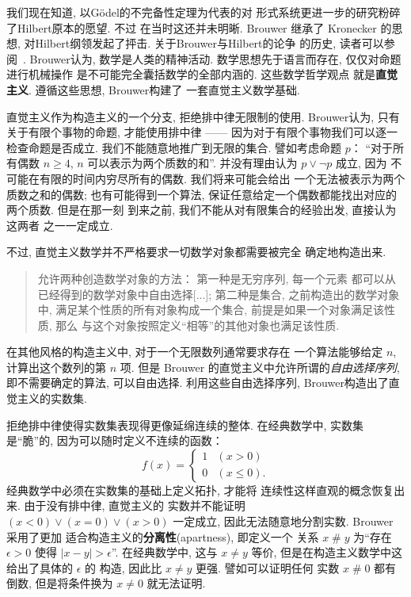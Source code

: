 \documentclass[UTF8]{ctexbook}
\theoremstyle{plain}
\theoremstyle{definition}
\theoremstyle{remark}
\begin{document}
我们现在知道, 以G\"odel的不完备性定理为代表的对
形式系统更进一步的研究粉碎了Hilbert原本的愿望. 不过
在当时这还并未明晰. Brouwer 继承了 Kronecker 的思想,
对Hilbert纲领发起了抨击. 关于Brouwer与Hilbert的论争
的历史, 读者可以参阅~\cite{carl:1998:brouwer}.
Brouwer认为, 数学是人类的精神活动.
数学思想先于语言而存在, 仅仅对命题进行机械操作
是不可能完全囊括数学的全部内涵的. 这些数学哲学观点
就是\textbf{直觉主义}. 遵循这些思想, Brouwer构建了
一套直觉主义数学基础.

直觉主义作为构造主义的一个分支, 拒绝排中律无限制的使用.
Brouwer认为, 只有关于有限个事物的命题, 才能使用排中律
------ 因为对于有限个事物我们可以逐一检查命题是否成立.
我们不能随意地推广到无限的集合. 譬如考虑命题 \(p\)：
“对于所有偶数 \(n \ge 4\), \(n\) 可以表示为两个质数的和”.
并没有理由认为 \(p \vee \neg p\) 成立, 因为
不可能在有限的时间内穷尽所有的偶数. 我们将来可能会给出
一个无法被表示为两个质数之和的偶数; 也有可能得到一个算法,
保证任意给定一个偶数都能找出对应的两个质数. 但是在那一刻
到来之前, 我们不能从对有限集合的经验出发, 直接认为这两者
之一一定成立.

不过, 直觉主义数学并不严格要求一切数学对象都需要被完全
确定地构造出来.
\begin{quotation}
允许两种创造数学对象的方法： 第一种是无穷序列, 每一个元素
都可以从已经得到的数学对象中自由选择[...]; 第二种是集合,
之前构造出的数学对象中, 满足某个性质的所有对象构成一个集合,
前提是如果一个对象满足该性质, 那么
与这个对象按照定义“相等”的其他对象也满足该性质.~\cite{brouwer:1981:intuitionism}
\end{quotation}
在其他风格的构造主义中, 对于一个无限数列通常要求存在
一个算法能够给定 \(n\), 计算出这个数列的第 \(n\) 项.
但是 Brouwer 的直觉主义中允许所谓的\emph{自由选择序列},
即不需要确定的算法, 可以自由选择. 利用这些自由选择序列,
Brouwer构造出了直觉主义的实数集.

拒绝排中律使得实数集表现得更像延绵连续的整体. 在经典数学中,
实数集是“脆”的, 因为可以随时定义不连续的函数：
\[f(x) = \begin{cases}
1 & (x > 0)\\
0 & (x \le 0).
\end{cases}\]
经典数学中必须在实数集的基础上定义拓扑, 才能将
连续性这样直观的概念恢复出来. 由于没有排中律, 直觉主义的
实数并不能证明 \((x < 0) \vee (x = 0) \vee (x > 0)\)
一定成立, 因此无法随意地分割实数. Brouwer 采用了更加
适合构造主义的\textbf{分离性}(apartness), 即定义一个
关系 \(x \mathop{\#} y\) 为“存在 \(\epsilon > 0\)
使得 \(|x - y| > \epsilon\)”. 在经典数学中, 这与
\(x \ne y\) 等价, 但是在构造主义数学中这给出了具体的 \(\epsilon\) 的
构造, 因此比 \(x \ne y\) 更强. 譬如可以证明任何
实数 \(x \mathop{\#} 0\) 都有倒数, 但是将条件换为
\(x \ne 0\) 就无法证明.
\end{document}
